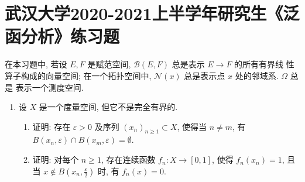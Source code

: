 \section{武汉大学2020-2021上半学年研究生《泛函分析》练习题}
    在本习题中, 若设 $E, F$ 是赋范空间, $\mathcal{B}(E, F)$ 总是表示 $E \rightarrow F$ 的所有有界线 性算子构成的向量空间; 在一个拓扑空间中, $\mathcal{N}(x)$ 总是表示点 $x$ 处的邻域系. $\Omega$ 总是 表示一个测度空间.
    \begin{enumerate}
        \item 设 $X$ 是一个度量空间, 但它不是完全有界的.
            \begin{enumerate}
                \item 证明: 存在 $\varepsilon>0$ 及序列 $\left(x_{n}\right)_{n \geq 1} \subset X$, 使得当 $n \neq  m$, 有 $B\left(x_{n}, \varepsilon\right) \cap B\left(x_{m}, \varepsilon\right)=\emptyset$.
                \item 证明: 对每个 $n \geq 1$, 存在连续函数 $f_{n}: X \rightarrow[0,1]$, 使得 $f_{n}\left(x_{n}\right)=1$, 且当 $x \notin B\left(x_{n}, \frac{\varepsilon}{2}\right)$ 时, 有 $f_{n}(x)=0$.

\end{enumerate}
\end{enumerate}
